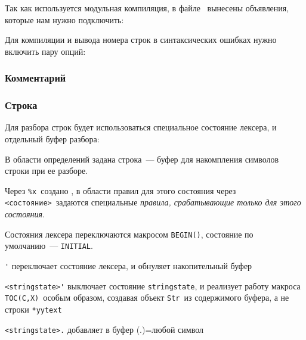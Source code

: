 \label{bilex}

Так как используется модульная компиляция, в файле \ вынесены
объявления, которые нам нужно подключить: 


Для компиляции и вывода номера строк в синтаксических ошибках
нужно включить пару опций:
 

\subsubsection{Комментарий}


\subsubsection{Строка}\label{lexstring}

Для разбора строк будет использоваться специальное состояние лексера,
и отдельный буфер разбора:  


В области определений задана строка\ --- буфер для накомпления символов строки
при ее разборе.

Через \verb|%x|\ создано ,
в области правил для этого состояния через \verb|<состояние>|\ задаются 
специальные \emph{правила, срабатывающие только для этого состояния}.

Состояния лексера переключаются макросом \verb|BEGIN()|, состояние по 
умолчанию\ --- \verb|INITIAL|.

\begin{description}
\item{\verb|'|} переключает состояние лексера, и обнуляет накопительный буфер
\item{\verb|<stringstate>'|} выключает состояние \verb|stringstate|,
и реализует работу макроса \verb|TOC(C,X)|\ особым образом, создавая объект
\verb|Str|\ из содержимого буфера, а не строки \verb|*yytext|
\item{\verb|<stringstate>.|} добавляет в буфер (.)=любой символ
\end{description}